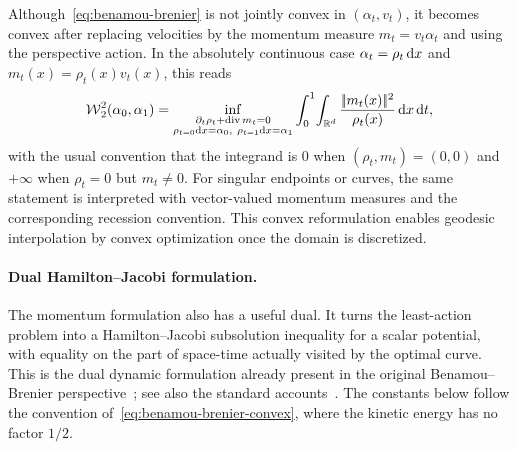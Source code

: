 Although~\eqref{eq:benamou-brenier} is not jointly convex in $(\alpha_t,v_t)$, it becomes convex after replacing velocities by the momentum measure $m_t=v_t\alpha_t$ and using the perspective action. In the absolutely continuous case $\alpha_t=\rho_t\,\mathrm{d} x$ and $m_t(x)=\rho_t(x)v_t(x)$, this reads
\begin{equation}\label{eq:benamou-brenier-convex}
	\operatorname{\mathcal{W}}_2^2(\alpha_0,\alpha_1)
	=
	\inf_{\substack{\partial_t\rho_t+\operatorname{div} m_t=0\\
	\rho_{t=0}\mathrm{d} x=\alpha_0,\ \rho_{t=1}\mathrm{d} x=\alpha_1}}
	\int_0^1\!\int_{\mathbb{R}^d}
	\frac{|\!| m_t(x) |\!|^2}{\rho_t(x)}\,\mathrm{d} x\,\mathrm{d} t,
	\end{equation}
with the usual convention that the integrand is $0$ when $(\rho_t,m_t)=(0,0)$ and $+\infty$ when $\rho_t=0$ but $m_t\neq0$. For singular endpoints or curves, the same statement is interpreted with vector-valued momentum measures and the corresponding recession convention. This convex reformulation enables geodesic interpolation by convex optimization once the domain is discretized.

\paragraph{Dual Hamilton--Jacobi formulation.}

The momentum formulation also has a useful dual. It turns the least-action problem into a Hamilton--Jacobi subsolution inequality for a scalar potential, with equality on the part of space-time actually visited by the optimal curve. This is the dual dynamic formulation already present in the original Benamou--Brenier perspective~\cite{benamou2000computational}; see also the standard accounts~\cite{Villani03,SantambrogioBook}. The constants below follow the convention of~\eqref{eq:benamou-brenier-convex}, where the kinetic energy has no factor $1/2$.


